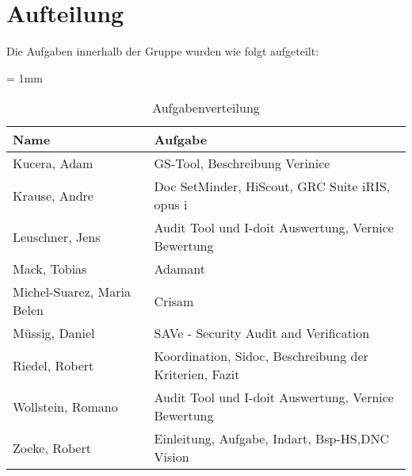 \section*{Aufteilung}
Die Aufgaben innerhalb der Gruppe wurden wie folgt aufgeteilt:

\begin{table}[H]
	\sffamily
	\caption{Aufgabenverteilung}
	\tabulinesep = 1mm %
	\centering
		\begin{tabu} to 0.9\textwidth { X[1.7]  X[3] }
		\hline
		\textbf{Name} & \textbf{Aufgabe}\\
		\hline 
		Kucera, Adam & GS-Tool, Beschreibung Verinice\\

		Krause, Andre & Doc SetMinder, HiScout, GRC Suite iRIS, opus i\\

		Leuschner, Jens & Audit Tool und I-doit Auswertung, Vernice Bewertung \\

		Mack, Tobias & Adamant\\

		Michel-Suarez, Maria Belen & Crisam\\

		Müssig, Daniel & SAVe - Security Audit and Verification\\

		Riedel, Robert & Koordination, Sidoc, Beschreibung der Kriterien, Fazit\\

		Wollstein, Romano & Audit Tool und I-doit Auswertung, Vernice Bewertung\\

		Zoeke, Robert & Einleitung, Aufgabe, Indart, Bsp-HS,DNC Vision\\

	\end{tabu}
\end{table}
